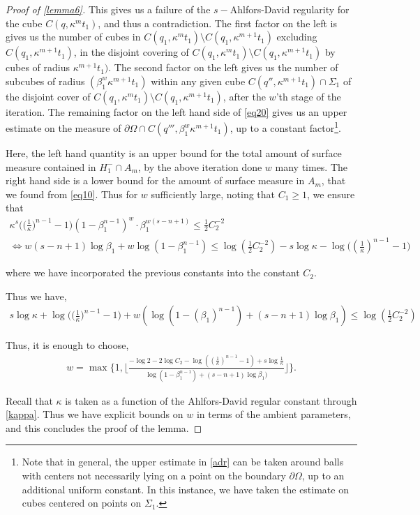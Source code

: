 \documentclass{article}
\newcounter{lem}
\theoremstyle{plain}
\theoremstyle{plain}
\newcommand{\en}{\beta_1}
\theoremstyle{definition}
\theoremstyle{plain}
\begin{document}
\begin{proof}[Proof of \cref{lemma6}]
This gives us a failure of the $s-$Ahlfors-David regularity for the cube $C(q,\kappa^{m} t_1)$, and thus a contradiction. The first factor on the left is gives us the number of cubes in $C(q_1,\kappa^{m}t_1)\setminus C(q_1,\kappa^{m+1}t_1)$ excluding $C(q_1,\kappa^{m+1}t_1)$, in the disjoint covering of $C(q_1,\kappa^{m}t_1)\setminus C(q_1,\kappa^{m+1}t_1)$  by cubes of radius $\kappa^{m+1}t_1)$. The second factor on the left gives us the number of subcubes of radius $(\beta_{1}^{w} \kappa^{m+1}t_1)$ within any given cube $C(q'', \kappa^{m+1}t_1)\cap \Sigma_1$ of the disjoint cover of $C(q_1,\kappa^{m}t_1)\setminus C(q_1,\kappa^{m+1}t_1)$, after the $w$'th stage of the iteration. The remaining factor on the left hand side of \cref{eq20} gives us an upper estimate on the measure of $\partial\Omega\cap C(q''',\beta_{1}^{w}\kappa^{m+1}t_1)$, up to a constant factor\footnote{Note that in general, the upper estimate in \cref{adr} can be taken around balls with centers not necessarily lying on a point on the boundary $\partial\Omega$, up to an additional uniform constant. In this instance, we have taken the estimate on cubes centered on points on $\Sigma_1$.}.

Here, the left hand quantity is an upper bound for the total amount of surface measure contained in $H^{-}_1 \cap A_m$, by the above iteration done $w$ many times. The right hand side is a lower bound for the amount of surface measure in $A_m$, that we found from \cref{eq10}.
       Thus for $w$ sufficiently large, noting that $C_{1}\geq 1$, we ensure that
       \begin{multline}
          \kappa^s \Big(\big(\frac{1}{\kappa}\big)^{n-1}-1\Big) (1-\beta_1 ^{n-1})^w \cdot \beta_1 ^{w(s-n+1)}\leq \frac{1}{2}C_{2}^{-2} \\ \Leftrightarrow w(s-n+1)\log \beta_1+ w\log(1-\beta_1^{n-1})  \leq \log (\frac{1}{2}C_{2}^{-2}) -s\log \kappa -\log\Big((\frac{1}{\kappa})^{n-1}-1\Big)
       \end{multline}

       where we have incorporated the previous constants into the constant $C_2$.
       
       Thus we have, 
       \begin{align}
       s\log \kappa+ \log\Big(\big(\frac{1}{\kappa}\big)^{n-1}-1\Big)+   w(\log(1-(\en)^{n-1})+(s-n+1)\log \en)\leq  \log (\frac{1}{2}C_{2}^{-2}) 
       \end{align}
       
       Thus, it is enough to choose, 
       \begin{align}\label{w estimate}
           w=\max \{1, \lfloor \frac{-\log 2 -2\log C_2 -\log((\frac{1}{\kappa})^{n-1}-1) +s\log \tfrac1\kappa}{\log(1-\beta_1^{n-1})+(s-n+1)\log \beta_1)}\rfloor \}.
       \end{align}

      Recall that $\kappa$ is taken as a function of the Ahlfors-David regular constant through \cref{kappa}. Thus we have explicit bounds on $w$ in terms of the ambient parameters, and this concludes the proof of the lemma.
    \end{proof}
\end{document}
